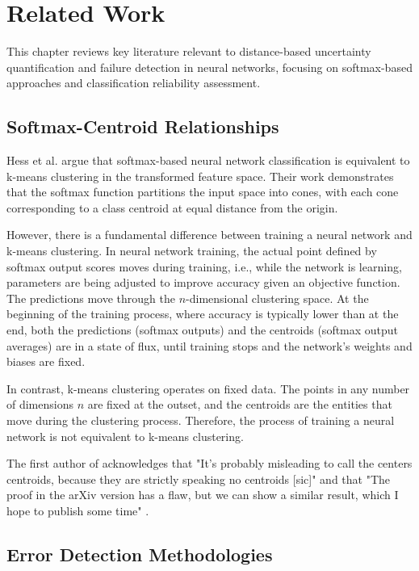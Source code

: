 \chapter{Related Work}
\label{chap:related_work}

This chapter reviews key literature relevant to distance-based uncertainty quantification and failure detection in neural networks, focusing on softmax-based approaches and classification reliability assessment.

\section{Softmax-Centroid Relationships}

Hess et al. \cite{HessEtAl2020} argue that softmax-based neural network classification is equivalent to k-means clustering in the transformed feature space. Their work demonstrates that the softmax function partitions the input space into cones, with each cone corresponding to a class centroid at equal distance from the origin.

However, there is a fundamental difference between training a neural network and k-means clustering. In neural network training, the actual point defined by softmax output scores moves during training, i.e., while the network is learning, parameters are being adjusted to improve accuracy given an objective function. The predictions move through the $n$-dimensional clustering space. At the beginning of the training process, where accuracy is typically lower than at the end, both the predictions (softmax outputs) and the centroids (softmax output averages) are in a state of flux, until training stops and the network's weights and biases are fixed.

In contrast, k-means clustering operates on fixed data. The points in any number of dimensions $n$ are fixed at the outset, and the centroids are the entities that move during the clustering process. Therefore, the process of training a neural network is not equivalent to k-means clustering.

The first author of \cite{HessEtAl2020} acknowledges that "It's probably misleading to call the centers centroids, because they are strictly speaking no centroids [sic]" and that "The proof in the arXiv version has a flaw, but we can show a similar result, which I hope to publish some time" \cite{hess2025email}.

\section{Error Detection Methodologies}

